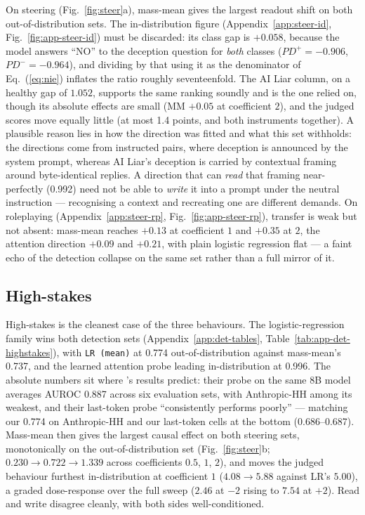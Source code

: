 \documentclass[conference]{IEEEtran}
\begin{document}
On steering (Fig.~\ref{fig:steer}a), mass-mean gives the largest readout shift
on both out-of-distribution sets. The in-distribution figure
(Appendix~\ref{app:steer-id}, Fig.~\ref{fig:app-steer-id}) must be discarded:
its class
gap is $+0.058$, because the model answers ``NO'' to the deception question for
\emph{both} classes ($PD^{+}=-0.906$, $PD^{-}=-0.964$), and dividing by that
using it as the denominator of Eq.~(\ref{eq:nie}) inflates the ratio roughly
seventeenfold. The AI Liar column, on a healthy gap
of $1.052$, supports the same ranking soundly and is the one relied on, though
its absolute effects are small (MM $+0.05$ at coefficient $2$), and the judged
scores move equally little (at most 1.4 points, and both instruments together).
A plausible reason lies in how the direction was fitted and what this set
withholds: the directions come from instructed pairs, where deception is
announced by the system prompt, whereas AI Liar's deception is carried by
contextual framing around byte-identical replies. A direction that can
\emph{read} that framing near-perfectly (0.992) need not be able to
\emph{write} it into a prompt under the neutral instruction --- recognising a
context and recreating one are different demands. On roleplaying
(Appendix~\ref{app:steer-rp}, Fig.~\ref{fig:app-steer-rp}),
transfer is weak but not absent: mass-mean reaches $+0.13$ at coefficient $1$
and $+0.35$ at $2$, the attention direction $+0.09$ and $+0.21$, with plain
logistic regression flat --- a faint echo of the detection collapse on the same
set rather than a full mirror of it.

\subsection{High-stakes}
High-stakes is the cleanest case of the three behaviours. The
logistic-regression family wins both detection
sets (Appendix~\ref{app:det-tables}, Table~\ref{tab:app-det-highstakes}), with
\texttt{LR (mean)} at 0.774
out-of-distribution against mass-mean's
0.737, and the learned attention probe leading in-distribution at 0.996.
The absolute numbers sit where \citeauthor{mckenzie2025}'s results predict:
their probe on the same 8B model averages AUROC 0.887 across six evaluation
sets, with Anthropic-HH among its weakest, and their last-token probe
``consistently performs poorly'' --- matching our 0.774 on Anthropic-HH and our
last-token cells at the bottom (0.686--0.687).
Mass-mean then gives the largest causal effect on both steering sets,
monotonically on the out-of-distribution set (Fig.~\ref{fig:steer}b;
$0.230 \to 0.722 \to 1.339$ across
coefficients $0.5$, $1$, $2$), and moves the judged behaviour furthest
in-distribution at coefficient $1$ ($4.08 \to 5.88$ against LR's $5.00$), a
graded dose-response over the full sweep ($2.46$ at $-2$ rising to $7.54$ at
$+2$). Read and write disagree cleanly, with both sides well-conditioned.
\end{document}
